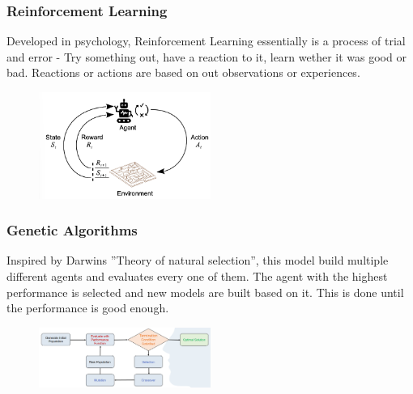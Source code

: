 \documentclass[
../../EiKI_Summary.tex,
]
{subfiles}
\begin{document}
\subsubsection{Reinforcement Learning}
Developed in psychology, Reinforcement Learning essentially is a process of trial and error - Try something out, have a reaction to it, learn wether it was good or bad. Reactions or actions are based on out observations or experiences.

\begin{figure}
    [htp]
    \centering
    \includegraphics[width=0.5\textwidth]{Pics/ReinforcementLearningLoop.png}
\end{figure}

\newpage
\subsubsection{Genetic Algorithms}
Inspired by Darwins ''Theory of natural selection'', this model build multiple different agents and evaluates every one of them. The agent with the highest performance is selected and new models are built based on it. This is done until the performance is good enough.

\begin{figure}
    [htp]
    \centering
    \includegraphics[width=0.5\textwidth]{Pics/GeneticAlgorithms.png}
\end{figure}
\end{document}

